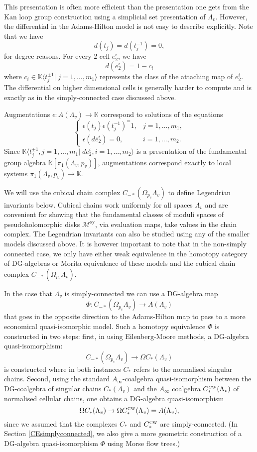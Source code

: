 \documentclass{gtpart}
\newcommand{\K}{\mathbb{K}}
\newcommand{\sy}{\mathrm{sy}}
\begin{document}
This presentation is often more efficient than the presentation one gets from the Kan loop group
construction using a simplicial set presentation of $\Lambda_v$. However, the
differential in the Adams-Hilton model is not easy to describe explicitly. 
Note that we have 
\[
d(t_j) = d(t_j^{-1}) =0, 
\] 
for degree reasons. For every 2-cell $e_2^{i}$, we have 
\[
d(\overline{e}_2^{i}) = 1 -c_i 
\] 
where $c_i \in \mathbb{K} \langle t^{\pm 1}_j |\;j=1,\dots,m_{1}\rangle$
represents the class of the attaching map of $e_2^{i}$. The differential on higher dimensional cells is generally harder to compute and is exactly as in the simply-connected case discussed above.  

Augmentations $\epsilon\colon A(\Lambda_v) \to \mathbb{K}$ correspond to solutions of the equations
\[
\begin{cases} 
\epsilon(t_j) \epsilon(t^{-1}_j) ^= 1, & j=1,\dots,m_{1},\\   
\epsilon(d \overline{e}_{2}^i)= 0, & i=1,\dots,m_{2}.
\end{cases}
\]
Since $\K \langle t_j^{\pm 1} ,  j=1,\dots, m_1 |\;  d\overline{e}_{2}^{i},  i=1,\ldots,m_{2} \rangle $ is a presentation of 
the fundamental group algebra $\K[\pi_1(\Lambda_v,p_v)]$, augmentations correspond exactly to local systems $\pi_1(\Lambda_v, p_v) \to \K$.

 
We will use the cubical chain complex $C_{-*}(\Omega_{p_v} \Lambda_v)$ to define Legendrian invariants below. Cubical chains work uniformly for all spaces $\Lambda_v$ and
are convenient for showing that the fundamental classes of moduli spaces of pseudoholomorphic disks $\mathcal{M}^{\sy}$, via evaluation maps, take values in the chain complex. 
The Legendrian invariants can also be studied using any of the smaller models discussed above. It is however important to note that in the non-simply connected case, we only have either weak equivalence in the homotopy category of
DG-algebras or Morita equivalence \cite{holstein, holstein2} of these models and the cubical chain complex $C_{-*}(\Omega_{p_v} \Lambda_v)$.


In the case that $\Lambda_v$ is simply-connected we can use a DG-algebra map 
\[ 
\Phi\colon C_{-*}(\Omega_{p_v} \Lambda_v) \to A(\Lambda_v) 
\] 
that goes in the opposite direction to the
Adams-Hilton map to pass to a more economical quasi-isomorphic model.
Such a homotopy equivalence $\Phi$ is constructed in two steps: first, in
\cite{Neisendorfer} using Eilenberg-Moore methods, a DG-algebra quasi-isomorphism:
\[ C_{-*}(\Omega_{p_v} \Lambda_v) \to \Omega C_*(\Lambda_v)\] 
is constructed where in both instances $C_*$ refers to the normalised singular chains. Second, using
the standard $A_\infty$-coalgebra quasi-isomorphism between the DG-coalgebra of singular chains $C_*(\Lambda_v)$ and
the $A_\infty$ coalgebra $C_{*}^{\text{\tiny CW}}(\Lambda_v)$ of normalised cellular chains, one obtains a DG-algebra quasi-isomorphism
\[ 
\Omega C_*(\Lambda_v) \to \Omega C_*^{\text{\tiny CW}}(\Lambda_v) = A(\Lambda_v),
\] 
since we assumed that the complexes $C_*$ and $C_*^{\text{\tiny CW}}$ are simply-connected. (In Section \ref{CEsimplyconnected},
we also give a more geometric construction of a DG-algebra quasi-isomorphism $\Phi$ using Morse flow
trees.)
\end{document}
